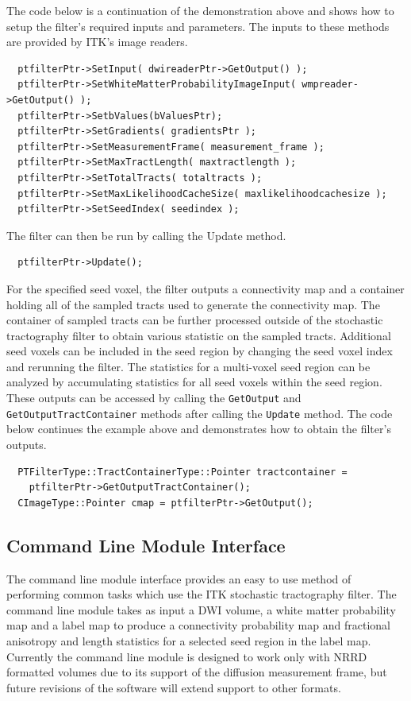 \documentclass{InsightArticle}
\begin{document}
The code below is a continuation of the demonstration above and shows how to setup the filter's required inputs and parameters.  The inputs to these methods are provided by ITK's image readers.
\begin{verbatim}
  ptfilterPtr->SetInput( dwireaderPtr->GetOutput() );
  ptfilterPtr->SetWhiteMatterProbabilityImageInput( wmpreader->GetOutput() );
  ptfilterPtr->SetbValues(bValuesPtr);
  ptfilterPtr->SetGradients( gradientsPtr );
  ptfilterPtr->SetMeasurementFrame( measurement_frame );
  ptfilterPtr->SetMaxTractLength( maxtractlength );
  ptfilterPtr->SetTotalTracts( totaltracts );
  ptfilterPtr->SetMaxLikelihoodCacheSize( maxlikelihoodcachesize );
  ptfilterPtr->SetSeedIndex( seedindex );
\end{verbatim}

The filter can then be run by calling the Update method.
\begin{verbatim}
  ptfilterPtr->Update();
\end{verbatim}

For the specified seed voxel, the filter outputs a connectivity map and a container holding all of the sampled tracts used to generate the connectivity map.  The container of sampled tracts can be further processed outside of the stochastic tractography filter to obtain various statistic on the sampled tracts.  Additional seed voxels can be included in the seed region by changing the seed voxel index and rerunning the filter.  The statistics for a multi-voxel seed region can be analyzed by accumulating statistics for all seed voxels within the seed region.  These outputs can be accessed by calling the  \texttt{GetOutput} and  \texttt{GetOutputTractContainer} methods after calling the  \texttt{Update} method.  The code below continues the example above and demonstrates how to obtain the filter's outputs.
\begin{verbatim}
  PTFilterType::TractContainerType::Pointer tractcontainer = 
    ptfilterPtr->GetOutputTractContainer();
  CImageType::Pointer cmap = ptfilterPtr->GetOutput();
\end{verbatim}

\subsection{Command Line Module Interface}
The command line module interface provides an easy to use method of performing common tasks which use the ITK stochastic tractography filter.  The command line module takes as input a DWI volume, a white matter probability map and a label map to produce a connectivity probability map and fractional anisotropy and length statistics for a selected seed region in the label map.  Currently the command line module is designed to work only with NRRD formatted volumes due to its support of the diffusion measurement frame, but future revisions of the software will extend support to other formats.
\end{document}
